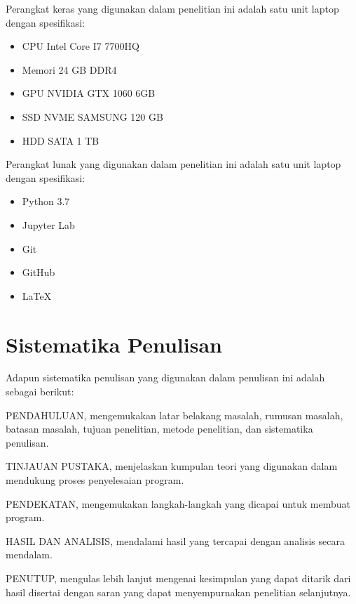 Perangkat keras yang digunakan dalam penelitian ini adalah satu unit laptop dengan spesifikasi:
\begin{itemize}
    \item CPU Intel Core I7 7700HQ
    \item Memori 24 GB DDR4
    \item GPU NVIDIA GTX 1060 6GB
    \item SSD NVME SAMSUNG 120 GB
    \item HDD SATA 1 TB
\end{itemize}

Perangkat lunak yang digunakan dalam penelitian ini adalah satu unit laptop dengan spesifikasi:
\begin{itemize}
    \item Python 3.7
    \item Jupyter Lab
    \item Git
    \item GitHub
    \item LaTeX
\end{itemize}

\section{Sistematika Penulisan}
\label{sec:1-SistematikaPenulisan}

Adapun sistematika penulisan yang digunakan dalam penulisan ini adalah sebagai berikut:

PENDAHULUAN, mengemukakan latar belakang masalah, rumusan masalah, batasan masalah, tujuan
penelitian, metode penelitian, dan sistematika penulisan.

TINJAUAN PUSTAKA, menjelaskan kumpulan teori yang digunakan dalam mendukung proses penyelesaian
program.

PENDEKATAN, mengemukakan langkah-langkah yang dicapai untuk membuat program.

HASIL DAN ANALISIS, mendalami hasil yang tercapai dengan analisis secara mendalam.

PENUTUP, mengulas lebih lanjut mengenai kesimpulan yang dapat ditarik dari hasil disertai dengan
saran yang dapat menyempurnakan penelitian selanjutnya.